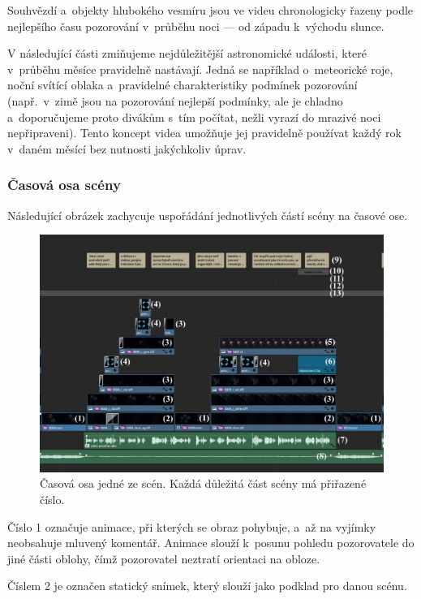 \documentclass[12pt,a4paper,titlepage]{article}
\begin{document}
Souhvězdí a~objekty hlubokého vesmíru jsou ve videu chronologicky řazeny podle nejlepšího času pozorování v~průběhu noci --- od západu k~východu slunce. 

V následující části zmiňujeme nejdůležitější astronomické události, které v~průběhu měsíce pravidelně nastávají. Jedná se například o~meteorické roje, noční svítící oblaka a~pravidelné charakteristiky podmínek pozorování (např.\ v~zimě jsou na pozorování nejlepší podmínky, ale je chladno a~doporučujeme proto divákům s~tím počítat, nežli vyrazí do mrazivé noci nepřipraveni). Tento koncept videa umožňuje jej pravidelně používat každý rok v~daném měsící bez nutnosti jakýchkoliv úprav.

\subsubsection{Časová osa scény}\label{makingof:resolve:merging}
Následující obrázek zachycuje uspořádání jednotlivých částí scény na časové ose.

\begin{figure}[H]
	\centering
	\includegraphics[width=1\textwidth]{timeline_annotated.eps}
	\caption{Časová osa jedné ze scén. Každá důležitá část scény má přiřazené číslo.}\label{img:timeline}
\end{figure}
Číslo 1 označuje animace, při kterých se obraz pohybuje, a~až na vyjímky neobsahuje mluvený komentář. Animace slouží k~posunu pohledu pozorovatele do jiné části oblohy, čímž pozorovatel neztratí orientaci na obloze. 

Číslem 2 je označen statický snímek, který slouží jako podklad pro danou scénu. 
\end{document}
